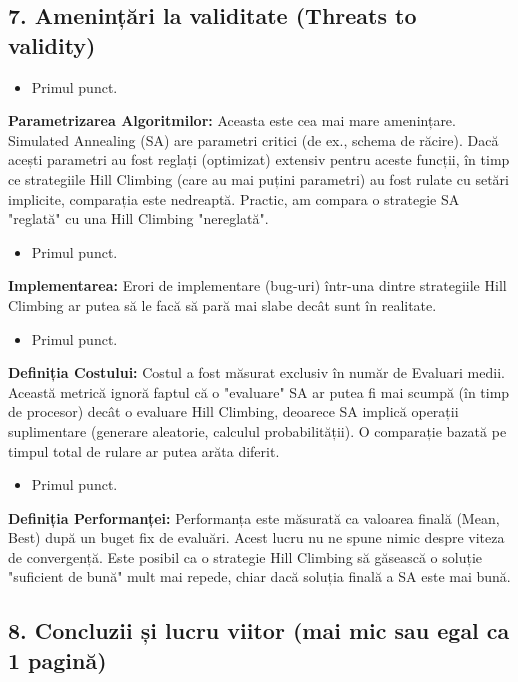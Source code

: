 \documentclass[
]{article}
\begin{document}
\hypertarget{ameninux21bux103ri-la-validitate-threats-to-validity}{%
\subsection{7. Amenințări la validitate (Threats to
validity)}\label{ameninux21bux103ri-la-validitate-threats-to-validity}}

\begin{itemize}
	\item Primul punct.
\end{itemize} \textbf{Parametrizarea Algoritmilor:} Aceasta este cea mai mare
amenințare. Simulated Annealing (SA) are parametri critici (de ex.,
schema de răcire). Dacă acești parametri au fost reglați (optimizat)
extensiv pentru aceste funcții, în timp ce strategiile Hill Climbing
(care au mai puțini parametri) au fost rulate cu setări implicite,
comparația este nedreaptă. Practic, am compara o strategie SA "reglată"
cu una Hill Climbing "nereglată".

\begin{itemize}
	\item Primul punct.
\end{itemize} \textbf{Implementarea:} Erori de implementare (bug-uri) într-una
dintre strategiile Hill Climbing ar putea să le facă să pară mai slabe
decât sunt în realitate. \begin{itemize}
	\item Primul punct.
\end{itemize} \textbf{Definiția Costului:} Costul a fost
măsurat exclusiv în număr de Evaluari medii. Această metrică ignoră
faptul că o "evaluare" SA ar putea fi mai scumpă (în timp de procesor)
decât o evaluare Hill Climbing, deoarece SA implică operații
suplimentare (generare aleatorie, calculul probabilității). O comparație
bazată pe timpul total de rulare ar putea arăta diferit.

\begin{itemize}
	\item Primul punct.
\end{itemize} \textbf{Definiția Performanței:} Performanța este măsurată ca valoarea
finală (Mean, Best) după un buget fix de evaluări. Acest lucru nu ne
spune nimic despre viteza de convergență. Este posibil ca o strategie
Hill Climbing să găsească o soluție "suficient de bună" mult mai repede,
chiar dacă soluția finală a SA este mai bună.

\hypertarget{concluzii-ux219i-lucru-viitor-1-paginux103}{%
\subsection{8. Concluzii și lucru viitor (mai mic sau egal ca 1
pagină)}\label{concluzii-ux219i-lucru-viitor-1-paginux103}}
\end{document}
